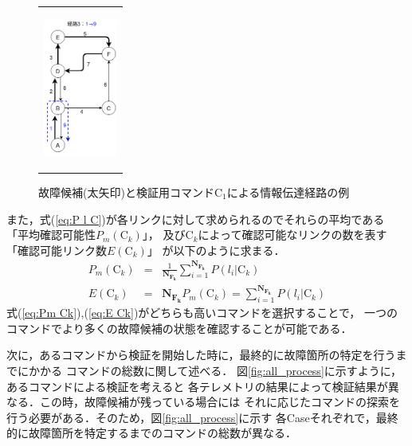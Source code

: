 \documentclass[11pt]{jsarticle}%
\begin{document}
\begin{multicols}{2}
\begin{figure}[H]
\begin{tabular}{c}
\begin{minipage}{0.30\hsize}
           \label{fig:route2}
        \end{minipage}
        \begin{minipage}{0.30\hsize}
           \centering
           \includegraphics[height=4.5cm]{../figure/route3.png}
              \label{fig:route2}
           \end{minipage}
     \end{tabular} 
     \caption{故障候補(太矢印)と検証用コマンドC$_1$による情報伝達経路の例}%
     \label{fig:route}
\end{figure}
\vspace{-1zh}
また，式(\ref{eq:P l C})が各リンクに対して求められるのでそれらの平均である
「平均確認可能性$P_m(\text{C}_k)$」，
及びC$_k$によって確認可能なリンクの数を表す「確認可能リンク数$E(\text{C}_k)$」
が以下のように求まる．
\begin{eqnarray}
  P_m(\text{C}_k) &=& \frac{1}{\mathbf{N_{F_k}}}\sum_{i=1}^{\mathbf{N_{F_k}}}
  P(l_i|\text{C}_k) \label{eq:Pm Ck} \\
  E(\text{C}_k) &=& \mathbf{N_{F_k}}P_m(\text{C}_k) =
   \sum_{i=1}^{\mathbf{N_{F_k}}}P(l_i|\text{C}_k) \label{eq:E Ck}
\end{eqnarray}
式(\ref{eq:Pm Ck}),(\ref{eq:E Ck})がどちらも高いコマンドを選択することで，
一つのコマンドでより多くの故障候補の状態を確認することが可能である．

次に，あるコマンドから検証を開始した時に，最終的に故障箇所の特定を行うまでにかかる
コマンドの総数に関して述べる．
図\ref{fig:all_process}に示すように，あるコマンドによる検証を考えると
各テレメトリの結果によって検証結果が異なる．この時，故障候補が残っている場合には
それに応じたコマンドの探索を行う必要がある．そのため，図\ref{fig:all_process}に示す
各Caseそれぞれで，最終的に故障箇所を特定するまでのコマンドの総数が異なる．


\end{multicols}
\end{document}
